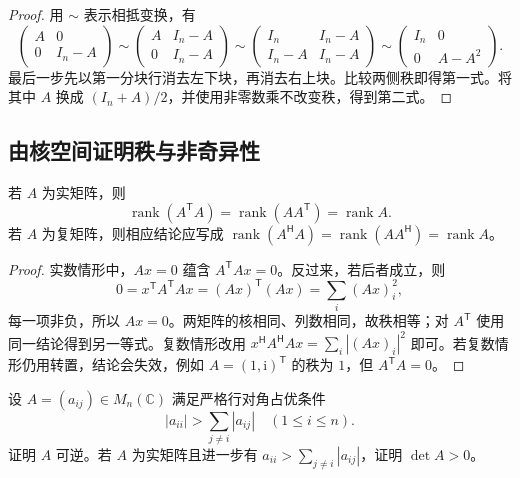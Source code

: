 \begin{proof}
用 $\sim$ 表示相抵变换，有
\[
\begin{pmatrix}A&0\\0&I_n-A\end{pmatrix}
\sim\begin{pmatrix}A&I_n-A\\0&I_n-A\end{pmatrix}
\sim\begin{pmatrix}I_n&I_n-A\\I_n-A&I_n-A\end{pmatrix}
\sim\begin{pmatrix}I_n&0\\0&A-A^2\end{pmatrix}.
\]
最后一步先以第一分块行消去左下块，再消去右上块。比较两侧秩即得第一式。将其中 $A$ 换成 $(I_n+A)/2$，并使用非零数乘不改变秩，得到第二式。
\end{proof}

\subsection{由核空间证明秩与非奇异性}

\begin{proposition}
\label{prop:laex-gram-rank}
若 $A$ 为实矩阵，则
\[
\operatorname{rank}(A^{\mathsf T}A)
=\operatorname{rank}(AA^{\mathsf T})=\operatorname{rank}A.
\]
若 $A$ 为复矩阵，则相应结论应写成 $\operatorname{rank}(A^{\mathsf H}A)=\operatorname{rank}(AA^{\mathsf H})=\operatorname{rank}A$。
\end{proposition}

\begin{proof}
实数情形中，$Ax=0$ 蕴含 $A^{\mathsf T}Ax=0$。反过来，若后者成立，则
\[
0=x^{\mathsf T}A^{\mathsf T}Ax
=(Ax)^{\mathsf T}(Ax)=\sum_i(Ax)_i^2,
\]
每一项非负，所以 $Ax=0$。两矩阵的核相同、列数相同，故秩相等；对 $A^{\mathsf T}$ 使用同一结论得到另一等式。复数情形改用 $x^{\mathsf H}A^{\mathsf H}Ax=\sum_i|(Ax)_i|^2$ 即可。若复数情形仍用转置，结论会失效，例如 $A=(1,\mathrm i)^{\mathsf T}$ 的秩为 $1$，但 $A^{\mathsf T}A=0$。
\end{proof}

\begin{example}
\label{ex:laex-diagonal-dominance}
设 $A=(a_{ij})\in M_n(\mathbb C)$ 满足严格行对角占优条件
\[
|a_{ii}|>\sum_{j\ne i}|a_{ij}|\quad(1\le i\le n).
\]
证明 $A$ 可逆。若 $A$ 为实矩阵且进一步有 $a_{ii}>\sum_{j\ne i}|a_{ij}|$，证明 $\det A>0$。
\end{example}

